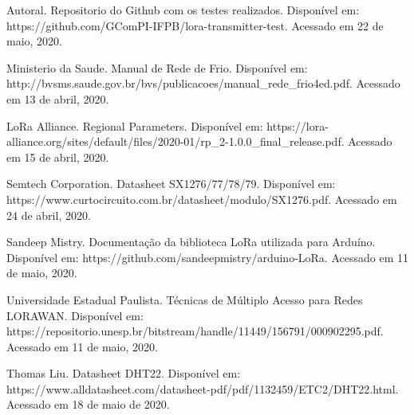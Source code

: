 \begin{thebibliography}{99}

     Autoral. Repositorio do Github com os testes realizados.  Disponível em: https://github.com/GComPI-IFPB/lora-transmitter-test. Acessado em 22 de maio, 2020.
    
     Ministerio da Saude. Manual de Rede de Frio.  Disponível em: http://bvsms.saude.gov.br/bvs/publicacoes/manual\_rede\_frio4ed.pdf. Acessado em 13 de abril, 2020.
    
     LoRa Alliance. Regional Parameters. Disponível em: https://lora-alliance.org/sites/default/files/2020-01/rp\_2-1.0.0\_final\_release.pdf. Acessado em 15 de abril, 2020.
    
     Semtech Corporation. Datasheet SX1276/77/78/79. Disponível em: https://www.curtocircuito.com.br/datasheet/modulo/SX1276.pdf. Acessado em 24 de abril, 2020.
    
     Sandeep Mistry. Documentação da biblioteca LoRa utilizada para Arduíno. Disponível em: https://github.com/sandeepmistry/arduino-LoRa. Acessado em 11 de maio, 2020.
    
     Universidade Estadual Paulista. Técnicas de Múltiplo Acesso para Redes LORAWAN. Disponível em: https://repositorio.unesp.br/bitstream/handle/11449/156791/000902295.pdf. Acessado em 11 de maio, 2020.
    
    Thomas Liu. Datasheet DHT22. Disponível em:  https://www.alldatasheet.com/datasheet-pdf/pdf/1132459/ETC2/DHT22.html. Acessado em 18 de maio de 2020.
    
\end{thebibliography}
